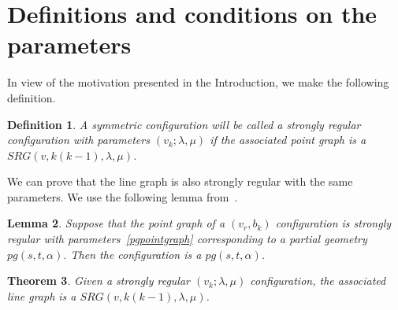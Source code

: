\documentclass[12pt, reqno]{amsart}
\newtheorem{theorem}{Theorem}[section]
\newtheorem{definition}[theorem]{Definition}
\newtheorem{lemma}[theorem]{Lemma}
\begin{document}
\section{Definitions and conditions on the parameters}\label{sec2}

In view of the motivation presented in the Introduction, we make the following definition.

\begin{definition}\label{maindef}
A symmetric configuration will be called a \emph{strongly regular configuration}
with parameters $(v_k;\lambda,\mu)$ if the associated point graph is a
$SRG(v,k(k-1),\lambda,\mu)$.
\end{definition}

We can prove that the line graph is also strongly regular with the same para\-meters.
We use the following lemma from~\cite{AMC81}.

\begin{lemma}\label{cohenlemma}
Suppose that the point graph of a $(v_r,b_k)$ configuration is strongly regular
with parameters~\eqref{pgpointgraph} corresponding to a partial geometry $pg(s,t,\alpha)$.
Then the configuration is a $pg(s,t,\alpha)$.
\end{lemma}

\begin{theorem}\label{linegraph}
Given a strongly regular $(v_k;\lambda,\mu)$ configuration, the associated line graph
is a $SRG(v,k(k-1),\lambda,\mu)$.
\end{theorem}
\end{document}
